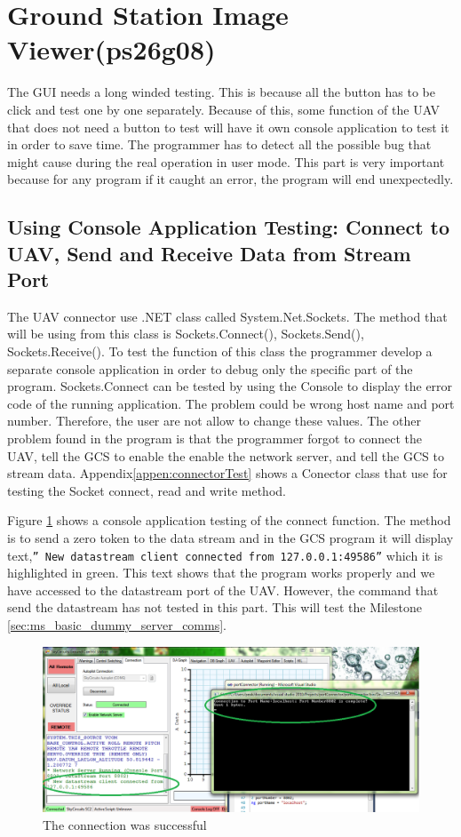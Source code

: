 \section{Ground Station Image Viewer(ps26g08)}
The GUI needs a long winded testing. This is because all the button has to be click and test one by one separately. Because of this, some function of the UAV that does not need a button to test will have it own console application to test it in order to save time. The programmer has to detect all the possible bug that might cause during the real operation in user mode. This part is very important because for any program if it caught an error, the program will end unexpectedly.
\subsection{Using Console Application Testing: Connect to UAV, Send and Receive Data from Stream Port}

The UAV connector use .NET class called System.Net.Sockets. The method that will be using from this class is Sockets.Connect(), Sockets.Send(), Sockets.Receive(). To test the function of this class the programmer develop a separate console application in order to debug only the specific part of the program. Sockets.Connect can be tested by using the Console to display the error code of the running application. The problem could be wrong host name and port number. Therefore, the user are not allow to change these values. The other problem found in the program is that the programmer forgot to connect the UAV, tell the GCS to enable the enable the network server, and tell the GCS to stream data. Appendix\ref{appen:connectorTest} shows a Conector class that use for testing the Socket connect, read and write method.

Figure \ref{connect to Stream Port} shows a console application testing of the connect function. 
The method is to send a zero token to the data stream and in the GCS program it will display text,\texttt{''\* New datastream client connected from 127.0.0.1:49586''} which it is highlighted in green. 
This text shows that the program works properly and we have accessed to the datastream port of the UAV.
However, the command that send the datastream has not tested in this part. 
This will test the Milestone \ref{sec:ms_basic_dummy_server_comms}.
\begin{figure}[H]
\begin{center}
\includegraphics[scale=1]{testing_screenshots/test_sending.png} 
\end{center}
\caption{The connection was successful\label{connect to Stream Port}}
\end{figure}


